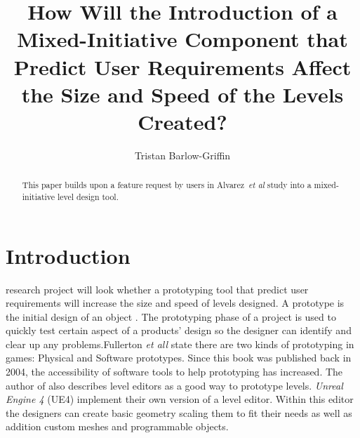 \documentclass[journal]{IEEEtran}
\begin{document}
%
\title{ How Will the Introduction of a Mixed-Initiative Component that Predict User Requirements Affect the Size and Speed of the Levels Created?}
%
%

\author{Tristan Barlow-Griffin}


\maketitle

\begin{abstract}
This paper builds upon a feature request by users in Alvarez~\textit{et al}\cite{alvarez2018fostering} study into a mixed-initiative level design tool. 
\end{abstract}





\section{Introduction} \label{intro}
 research project will look whether a prototyping tool that predict user requirements will increase the size and speed of levels designed. A prototype is the initial design of an object \cite{prototype}. The prototyping phase of a project is used to quickly test certain aspect of a products' design so the designer can identify and clear up any problems\cite{budde1992prototyping}.Fullerton \textit{et all} \cite[p.~150]{fullerton2004game} state there are two kinds of prototyping in games: Physical and Software prototypes. Since this book was published back in 2004, the accessibility of software tools to help prototyping has increased. The author of \cite[p.~164]{fullerton2004game} also describes level editors as a good way to prototype levels. \textit{Unreal Engine 4} (UE4) implement their own version of a level editor. Within this editor the designers can create basic geometry scaling them to fit their needs as well as addition custom meshes and programmable objects.
\end{document}
